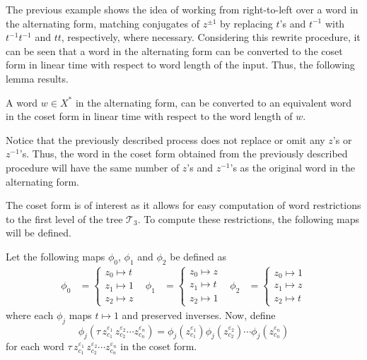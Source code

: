 The previous example shows the idea of working from right-to-left over a word in the alternating form, matching conjugates of $z^{\pm 1}$ by replacing  $t$'s and $t^{-1}$ with $t^{-1}t^{-1}$ and $tt$, respectively, where necessary.
Considering this rewrite procedure, it can be seen that a word in the alternating form can be converted to the coset form in linear time with respect to word length of the input.
Thus, the following lemma results.

\begin{lemma}
	\label{lemma:coset-form-linear}
	A word $w \in X^\ast$ in the alternating form, can be converted to an equivalent word in the coset form in linear time with respect to the word length of $w$.
\end{lemma}

\begin{remark}
	\label{rmk:constantNumberZ}
	Notice that the previously described process does not replace or omit any $z$'s or $z^{-1}$'s.
	Thus, the word in the coset form obtained from the previously described procedure will have the same number of $z$'s and $z^{-1}$'s as the original word in the alternating form.
	\thmendmark
\end{remark}

The coset form is of interest as it allows for easy computation of word restrictions to the first level of the tree $\mathcal{T}_3$.
To compute these restrictions, the following maps will be defined.

\begin{definition}
	\label{def:phi-maps}
	Let the following maps $\phi_0$, $\phi_1$ and $\phi_2$  be defined as
	\begin{align*}
	\phi_0 &=
	\begin{cases}
	z_0 \mapsto t\\
	z_1 \mapsto 1\\
	z_2 \mapsto z
	\end{cases}
	&
	\phi_1 &=
	\begin{cases}
	z_0 \mapsto z\\
	z_1 \mapsto t\\
	z_2 \mapsto 1
	\end{cases}
	&
	\phi_2 &=
	\begin{cases}
	z_0 \mapsto 1\\
	z_1 \mapsto z\\
	z_2 \mapsto t
	\end{cases}
	\end{align*}
	where each $\phi_j$ maps $t \mapsto 1$ and preserved inverses.
	Now, define
	\[
	  \phi_j\left(
	    \tau
	    \,
	    z_{c_1}^{\varepsilon_1}
	    \,
	    z_{c_2}^{\varepsilon_2}
	    \cdots
	    z_{c_n}^{\varepsilon_n}
	  \right)
	  =
	  \phi_j\left(z_{c_1}^{\varepsilon_1}\right)
	  \phi_j\left(z_{c_2}^{\varepsilon_2}\right)
	  \cdots
	  \phi_j\left(z_{c_n}^{\varepsilon_n}\right)
	\]
	for each word $\tau \, z_{c_1}^{\varepsilon_1} \, z_{c_2}^{\varepsilon_2} \cdots z_{c_n}^{\varepsilon_n}$ in the coset form.
\end{definition}

